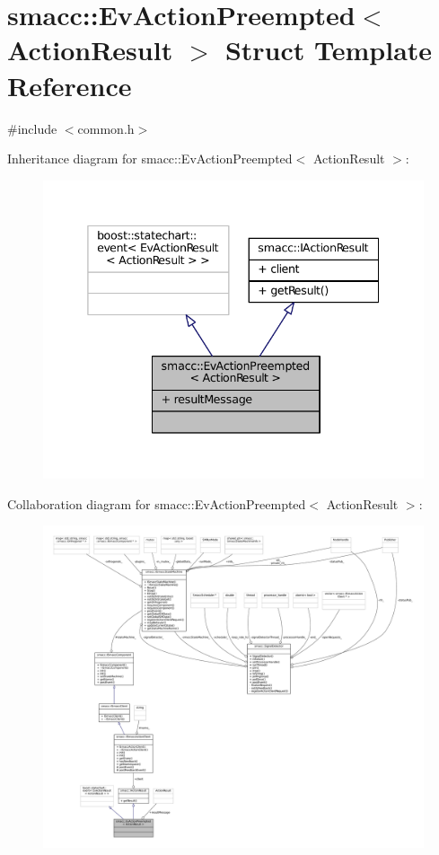 \hypertarget{structsmacc_1_1EvActionPreempted}{}\section{smacc\+:\+:Ev\+Action\+Preempted$<$ Action\+Result $>$ Struct Template Reference}
\label{structsmacc_1_1EvActionPreempted}


{\ttfamily \#include $<$common.\+h$>$}



Inheritance diagram for smacc\+:\+:Ev\+Action\+Preempted$<$ Action\+Result $>$\+:
\nopagebreak
\begin{figure}[H]
\begin{center}
\leavevmode
\includegraphics[width=338pt]{structsmacc_1_1EvActionPreempted__inherit__graph}
\end{center}
\end{figure}


Collaboration diagram for smacc\+:\+:Ev\+Action\+Preempted$<$ Action\+Result $>$\+:
\nopagebreak
\begin{figure}[H]
\begin{center}
\leavevmode
\includegraphics[width=350pt]{structsmacc_1_1EvActionPreempted__coll__graph}
\end{center}
\end{figure}
